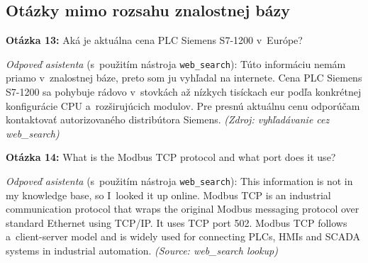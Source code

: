 \subsection*{Otázky mimo rozsahu znalostnej bázy}

\textbf{Otázka 13:} Aká je aktuálna cena PLC Siemens S7-1200 v~Európe?

\textit{Odpoveď asistenta} (s~použitím nástroja \texttt{web\_search}):
Túto informáciu nemám priamo v~znalostnej báze, preto som ju vyhľadal na
internete. Cena PLC Siemens S7-1200 sa pohybuje rádovo v~stovkách až nízkych
tisíckach eur podľa konkrétnej konfigurácie CPU a~rozširujúcich modulov.
Pre presnú aktuálnu cenu odporúčam kontaktovať autorizovaného distribútora
Siemens. \textit{(Zdroj: vyhľadávanie cez web\_search)}

\bigskip
\noindent\textbf{Otázka 14:} What is the Modbus TCP protocol and what port does it use?

\textit{Odpoveď asistenta} (s~použitím nástroja \texttt{web\_search}):
This information is not in my knowledge base, so I~looked it up online.
Modbus TCP is an industrial communication protocol that wraps the original
Modbus messaging protocol over standard Ethernet using TCP/IP. It uses
TCP port 502. Modbus TCP follows a~client-server model and is widely used
for connecting PLCs, HMIs and SCADA systems in industrial automation.
\textit{(Source: web\_search lookup)}
